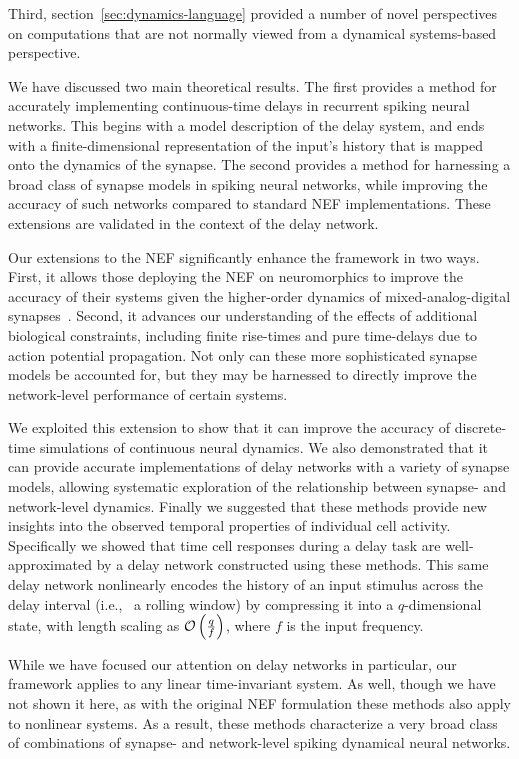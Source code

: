Third, section~\ref{sec:dynamics-language} provided a number of novel perspectives on computations that are not normally viewed from a dynamical systems-based perspective.



We have discussed two main theoretical results.
The first provides a method for accurately implementing continuous-time delays in recurrent spiking neural networks.
This begins with a model description of the delay system, and ends with a finite-dimensional representation of the input's history that is mapped onto the dynamics of the synapse.
The second provides a method for harnessing a broad class of synapse models in spiking neural networks, while improving the accuracy of such networks compared to standard NEF implementations.
These extensions are validated in the context of the delay network.

Our extensions to the NEF significantly enhance the framework in two ways.
First, it allows those deploying the NEF on neuromorphics to improve the accuracy of their systems given the higher-order dynamics of mixed-analog-digital synapses~\citep{voelker2017iscas, voelker2017neuromorphic}.
Second, it advances our understanding of the effects of additional biological constraints, including finite rise-times and pure time-delays due to action potential propagation.
Not only can these more sophisticated synapse models be accounted for, but they may be harnessed to directly improve the network-level performance of certain systems.

We exploited this extension to show that it can improve the accuracy of discrete-time simulations of continuous neural dynamics.
We also demonstrated that it can provide accurate implementations of delay networks with a variety of synapse models, allowing systematic exploration of the relationship between synapse- and network-level dynamics.
Finally we suggested that these methods provide new insights into the observed temporal properties of individual cell activity.
Specifically we showed that time cell responses during a delay task are well-approximated by a delay network constructed using these methods.
This same delay network nonlinearly encodes the history of an input stimulus across the delay interval (i.e.,~ a rolling window) by compressing it into a $q$-dimensional state, with length scaling as $\mathcal{O}\left({ \frac{q}{f} }\right)$, where $f$ is the input frequency.

While we have focused our attention on delay networks in particular, our framework applies to any linear time-invariant system.
As well, though we have not shown it here, as with the original NEF formulation these methods also apply to nonlinear systems.
As a result, these methods characterize a very broad class of combinations of synapse- and network-level spiking dynamical neural networks.

